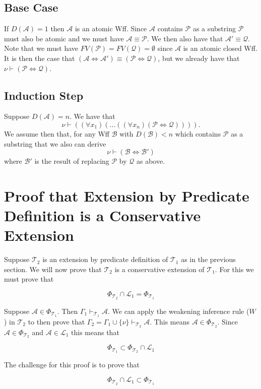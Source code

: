 \documentclass[12pt]{article}
\theoremstyle{break}
\theoremstyle{break}
\theoremstyle{break}
\theoremstyle{break}
\theoremstyle{break}
\newtheorem{informal definition}[definition]{Informal Definition}
\newcommand{\mc}[1]{\mathcal{#1}}
\begin{document}
\subsection*{Base Case}

If $D(\mc{A}) = 1$ then $\mc{A}$ is an atomic Wff.
Since $\mc{A}$ contains $\mc{P}$ as a substring $\mc{P}$ must also be atomic and we must have $\mc{A} \equiv \mc{P}$.
We then also have that $\mc{A}' \equiv \mc{Q}$.
Note that we must have $FV(\mc{P}) = FV(\mc{Q}) = \emptyset$ since $\mc{A}$ is an atomic closed Wff.
It is then the case that $(\mc{A} \iff \mc{A}') \equiv (\mc{P} \iff \mc{Q})$, but we already have that $\nu \vdash (\mc{P} \iff \mc{Q})$.

\subsection*{Induction Step}

Suppose $D(\mc{A}) = n$.
We have that
$$
\nu \vdash ((\forall x_1)(\ldots((\forall x_n) (\mc{P} \iff \mc{Q})))).
$$
We assume then that, for any Wff $\mc{B}$ with $D(\mc{B}) < n$ which contains $\mc{P}$ as a substring that we also can derive
$$
\nu \vdash (\mc{B} \iff \mc{B}')
$$
where $\mc{B}'$ is the result of replacing $\mc{P}$ by $\mc{Q}$ as above.




\section{Proof that Extension by Predicate Definition is a Conservative Extension}

Suppose $\mc{T}_2$ is an extension by predicate definition of $\mc{T}_1$ as in the previous section.
We will now prove that $\mc{T}_2$ is a conservative extension of $\mc{T}_1$.
For this we must prove that

$$
\Phi_{\mc{T}_2} \cap \mc{L}_1 = \Phi_{\mc{T}_1}
$$

Suppose $\mc{A} \in \Phi_{\mc{T}_1}$.
Then $\Gamma_1 \vdash_{\mc{T}_1} \mc{A}$.
We can apply the weakening inference rule ($W$) in $\mc{T}_2$ to then prove that $\Gamma_2 = \Gamma_1 \cup \{\nu\} \vdash_{\mc{T}_2} \mc{A}$.
This means $\mc{A} \in \Phi_{\mc{T}_2}$.
Since $\mc{A} \in \Phi_{\mc{T}_2}$ and $\mc{A} \in \mc{L}_1$ this means that

$$
\Phi_{\mc{T}_1} \subset \Phi_{\mc{T}_2} \cap \mc{L}_1
$$

The challenge for this proof is to prove that

$$
\Phi_{\mc{T}_2} \cap \mc{L}_1 \subset \Phi_{\mc{T}_1}
$$
\end{document}
